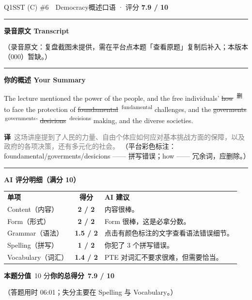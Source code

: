 \documentclass[11pt]{article}
\newcommand{\fix}[2]{%
  \colorbox{cWrongBg}{\textcolor{cWrong}{\sout{#1}}}%
  \,\textsuperscript{\textcolor{cFix}{\footnotesize #2}}}
\newcommand{\del}[1]{%
  \colorbox{cDelBg}{\textcolor{cDelete}{\sout{#1}}}%
  \,\textsuperscript{\textcolor{cDelete}{\footnotesize 删}}}
\newcommand{\sfull}[1]{\textcolor{cFix}{\bfseries #1}}     %
\newcommand{\spart}[1]{\textcolor{cPartial}{\bfseries #1}} %
\newcommand{\ptesub}[1]{%
  \par\needspace{2\baselineskip}\smallskip
  {\color{cAccent}\rule[-0.2ex]{3pt}{1.05em}}\hspace{6pt}%
  {\bfseries\color{cHead}#1}\par\nopagebreak\smallskip}
\newcommand{\zh}[1]{{\footnotesize\textcolor{cNote}{\textbf{译}}\ \textcolor{gray}{#1}}}
\begin{document}

\begin{qblock}{Q1\quad SST (C) \#6\ \ Democracy}{概述口语 · 评分 \textcolor{cAccent}{\bfseries 7.9 / 10}}
\ptesub{录音原文 Transcript}
\begin{promptbox}
{\color{cWrong}（录音原文：复盘截图未提供，需在平台点本题「查看原题」复制后补入；本版本（000）暂缺。）}
\end{promptbox}
\ptesub{你的概述 Your Summary}
\begin{youbox}
The lecture mentioned the power of the people, and the free individuals' \del{how} to face the protection of \fix{foundamental}{fundamental} challenges, and the \fix{goverments}{governments}' \fix{desicions}{decisions} making, and the diverse societies.
\end{youbox}
\zh{这场讲座提到了人民的力量、自由个体应如何应对基本挑战方面的保障，以及政府的各项决策，还有多元化的社会。}
{\footnotesize\color{gray}（平台彩色标注：foundamental/goverments/desicions —— 拼写错误；how —— 冗余词，应删除。）}
\ptesub{AI 评分明细（满分 10）}
\begin{notebox}
{\renewcommand{\arraystretch}{1.35}
\begin{tabularx}{\linewidth}{@{}l c Z@{}}
\textbf{单项} & \textbf{得分} & \textbf{AI 建议}\\[2pt]
Content（内容）& \sfull{2 / 2} & 内容很棒。\\
Form（形式）& \sfull{2 / 2} & Form 很棒，这是必拿分数。\\
Grammar（语法）& \spart{1.5 / 2} & 点击有颜色标注的文字查看语法错误细节。\\
Spelling（拼写）& \spart{1 / 2} & 你犯了 3 个拼写错误。\\
Vocabulary（词汇）& \spart{1.4 / 2} & PTE 对词汇不要求很难，但需要恰当。\\
\end{tabularx}}
\smallskip
\textbf{本题分值}\ 10 分\qquad\textbf{你的总得分}\ \textcolor{cAccent}{\bfseries 7.9 / 10}
\end{notebox}
\smallskip
{\footnotesize\color{gray}（答题用时 06:01；失分主要在 Spelling 与 Vocabulary。）}
\end{qblock}
\end{document}
